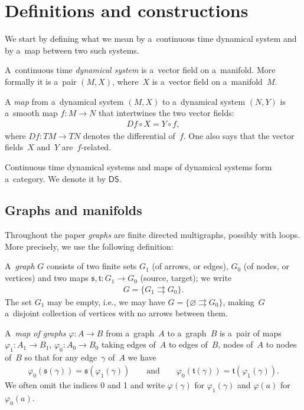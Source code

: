 \documentclass[10pt,a4paper]{amsart}
\numberwithin{equation}{section}
\begin{document}
\section{Definitions and constructions}

\noindent We start by def\/ining what we mean by a~continuous time dynamical system and by a~map between two such systems.
\begin{Definition}
\label{def:dyn-sys}
A~continuous time {\it dynamical system} is a~vector f\/ield on a~manifold.
More formally it is a~pair $(M,X)$, where~$X$ is a~vector f\/ield on a~manifold~$M$.

A {\it map} from a~dynamical system $(M,X)$ to a~dynamical system $(N, Y)$ is a~smooth map $f:M\to N$ that intertwines
the two vector f\/ields:
\begin{gather*}
Df\circ X = Y\circ f,
\end{gather*}
where $Df:TM\to TN$ denotes the dif\/ferential of~$f$.
One also says that the vector f\/ields~$X$ and~$Y$ are~$f$-related.
\end{Definition}

\begin{Notation}
\label{rmrk:dyn-sys}
Continuous time dynamical systems and maps of dynamical systems form a~category.
We denote it by $\mathsf{DS}$.
\end{Notation}

\subsection{Graphs and manifolds}

Throughout the paper {\em graphs} are f\/inite directed multigraphs, possibly with loops.
More precisely, we use the following def\/inition:
\begin{Definition}%
A~{\it graph} $ G$ consists of two f\/inite sets $G_1$ (of arrows, or edges), $G_0$ (of nodes, or vertices) and two maps
$\mathfrak s,\mathfrak t\colon G_1 \to G_0$ (source, target); we write
\begin{gather*}
G = \{G_1\rightrightarrows G_0\}.
\end{gather*}
The set $G_1$ may be empty, i.e., we may have $G= \{\varnothing \rightrightarrows G_0\}$, making~$G$ a~disjoint
collection of vertices with no arrows between them.
\end{Definition}

\begin{Definition}
A~{\it map of graphs} $\varphi\colon A\to B$ from a~graph~$A$ to a~graph~$B$ is a~pair of maps $\varphi_1\colon A_1\to
B_1$, $\varphi_0\colon A_0\to B_0$ taking edges of~$A$ to edges of~$B$, nodes of~$A$ to nodes of~$B$ so that for any
edge~$\gamma$ of~$A$ we have
\begin{gather*}
\varphi_0 (\mathfrak s(\gamma)) = \mathfrak s(\varphi_1 (\gamma))
\qquad
\text{and}
\qquad
\varphi_0 (\mathfrak t(\gamma)) = \mathfrak t(\varphi_1 (\gamma)).
\end{gather*}
We often omit the indices 0 and 1 and write $\varphi(\gamma)$ for $\varphi_1 (\gamma)$ and $\varphi(a)$ for $\varphi_0(a)$.
\end{Definition}
\end{document}
